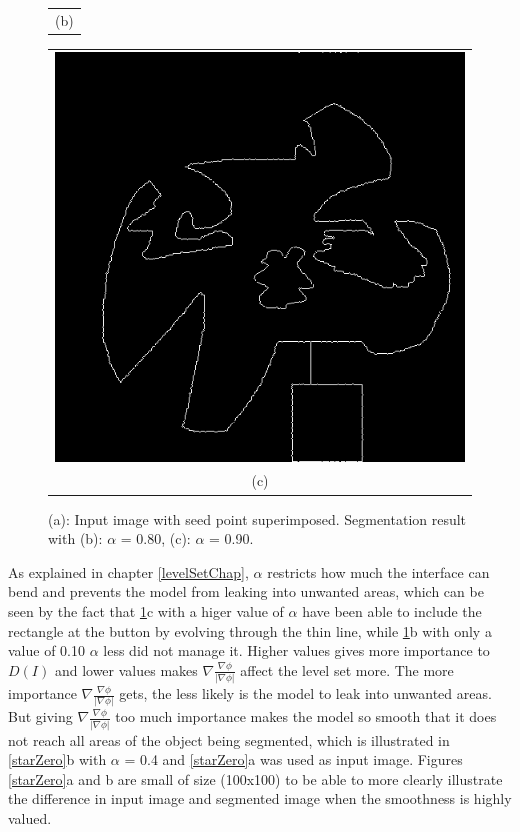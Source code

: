 \begin{figure}[h!]
\begin{minipage}{.49\textwidth}
\begin{tabular}{c}
(b)
\end{tabular}
\end{minipage}
\begin{minipage}{.49\textwidth}
\begin{tabular}{c}
\includegraphics[width=.9\textwidth]{results/randOrgWSeeda090} \\
(c)
\end{tabular}
\end{minipage}
\caption{(a): Input image with seed point superimposed. Segmentation result with (b): $\alpha$ = 0.80, (c): $\alpha$ = 0.90.}
\label{randOrgWSeed}
\end{figure}
As explained in chapter \ref{levelSetChap}, $\alpha$ restricts how much the interface can bend and prevents the model from leaking into unwanted areas, which can be seen by the fact that \ref{randOrgWSeed}c with a higer value of $\alpha$ have been able to include the rectangle at the button by evolving through the thin line, while \ref{randOrgWSeed}b with only a value of 0.10 $\alpha$ less did not manage it. Higher values gives more importance to \(D(I)\) and lower values makes \(\nabla \frac{\nabla \phi}{|\nabla \phi|}\) affect the level set more. The more importance \(\nabla \frac{\nabla \phi}{|\nabla \phi|}\) gets, the less likely is the model to leak into unwanted areas. But giving \(\nabla \frac{\nabla \phi}{|\nabla \phi|}\) too much importance makes the model so smooth that it does not reach all areas of the object being segmented, which is illustrated in \ref{starZero}b with $\alpha$ = 0.4 and \ref{starZero}a was used as input image. Figures \ref{starZero}a and b are small of size (100x100) to be able to more clearly illustrate the difference in input image and segmented image when the smoothness is highly valued.
